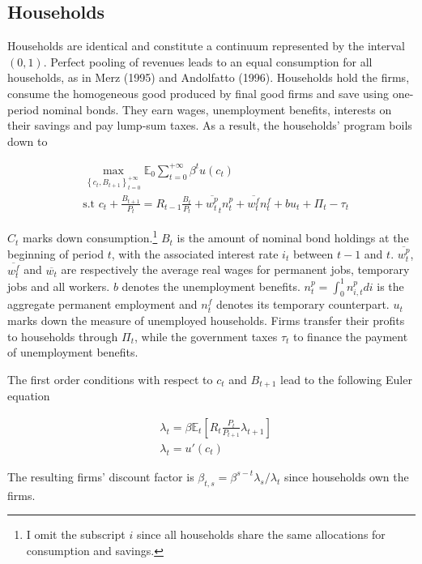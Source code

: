 \documentclass[a4paper]{article}
\begin{document}
\subsection{Households}

Households are identical and constitute a continuum represented  by the interval $(0,1)$. Perfect pooling of revenues leads to an equal consumption for all households, as in Merz (1995) and Andolfatto (1996). Households hold the firms, consume the homogeneous good produced by final good firms and save using one-period nominal bonds. They earn wages, unemployment benefits, interests on their savings and pay lump-sum taxes. As a result, the households' program boils down to

\begin{align*}
&\max_{\left\{c_t, B_{t+1} \right\}_{t=0}^{+\infty}} \mathbb{E}_0 \sum_{t = 0}^{+\infty} \beta^t u\left(c_t\right)\\
&\text{s.t } c_t + \frac{B_{t+1}}{P_t} = R_{t-1} \frac{B_{t}}{P_t} + \overline{w_t^p}_t n_t^p + \overline{w_t^f} n_t^f + b u_t + \Pi_t - \tau_t
\end{align*}

$C_t$ marks down consumption.\footnote{I omit the subscript $i$ since all households share the same allocations for consumption and savings.} $B_{t}$ is the amount of nominal bond holdings at the beginning of period $t$, with the associated interest rate $i_t$ between $t-1$ and $t$. $\overline{w_t^p}$, $\overline{w_t^f}$ and $\overline{w_t}$ are respectively the average real wages for permanent jobs, temporary jobs and all workers. $b$ denotes the unemployment benefits. $n_t^p = \int_{0}^{1} n_{i,t}^p di$ is the aggregate permanent employment and $n_t^f$ denotes its temporary counterpart. $u_t$ marks down the measure of unemployed households. Firms transfer their profits to households through $\Pi_t$, while the government taxes $\tau_t$ to finance the payment of unemployment benefits.

The first order conditions with respect to $c_t$ and $B_{t+1}$ lead to the following Euler equation

\begin{align}
&\lambda_t = \beta \mathbb{E}_t \left[ R_{t} \frac{P_t}{P_{t+1}} \lambda_{t+1} \right] \label{euler_eq}\\
&\lambda_t = u' \left( c_t \right)\label{def_up}
\end{align}

The resulting firms' discount factor is $\beta_{t,s} = \beta^{s-t} \lambda_s / \lambda_t$ since households own the firms.
\end{document}
